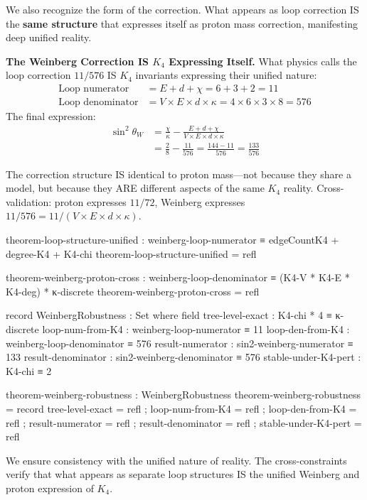 \documentclass[11pt,a4paper]{book}
\begin{document}
We also recognize the form of the correction. What appears as loop correction IS the \textbf{same structure} that expresses itself as proton mass correction, manifesting deep unified reality.

\textbf{The Weinberg Correction IS $K_4$ Expressing Itself.} What physics calls the loop correction $11/576$ IS $K_4$ invariants expressing their unified nature:
\begin{align*}
\text{Loop numerator} &= E + d + \chi = 6 + 3 + 2 = 11 \\
\text{Loop denominator} &= V \times E \times d \times \kappa = 4 \times 6 \times 3 \times 8 = 576
\end{align*}
The final expression:
\begin{align*}
\sin^2\theta_W &= \frac{\chi}{\kappa} - \frac{E + d + \chi}{V \times E \times d \times \kappa} \\
               &= \frac{2}{8} - \frac{11}{576} = \frac{144 - 11}{576} = \frac{133}{576}
\end{align*}

The correction structure IS identical to proton mass—not because they share a model, but because they ARE different aspects of the same $K_4$ reality.
Cross-validation: proton expresses $11/72$, Weinberg expresses $11/576 = 11/(V \times E \times d \times \kappa)$.

\begin{code}
theorem-loop-structure-unified : weinberg-loop-numerator ≡ edgeCountK4 + degree-K4 + K4-chi
theorem-loop-structure-unified = refl

theorem-weinberg-proton-cross : weinberg-loop-denominator ≡ (K4-V * K4-E * K4-deg) * κ-discrete
theorem-weinberg-proton-cross = refl

record WeinbergRobustness : Set where
  field
    tree-level-exact         : K4-chi * 4 ≡ κ-discrete
    loop-num-from-K4         : weinberg-loop-numerator ≡ 11
    loop-den-from-K4         : weinberg-loop-denominator ≡ 576
    result-numerator         : sin2-weinberg-numerator ≡ 133
    result-denominator       : sin2-weinberg-denominator ≡ 576
    stable-under-K4-pert     : K4-chi ≡ 2

theorem-weinberg-robustness : WeinbergRobustness
theorem-weinberg-robustness = record
  { tree-level-exact = refl
  ; loop-num-from-K4 = refl
  ; loop-den-from-K4 = refl
  ; result-numerator = refl
  ; result-denominator = refl
  ; stable-under-K4-pert = refl
  }
\end{code}

We ensure consistency with the unified nature of reality. The cross-constraints verify that what appears as separate loop structures IS the unified Weinberg and proton expression of $K_4$.
\end{document}
